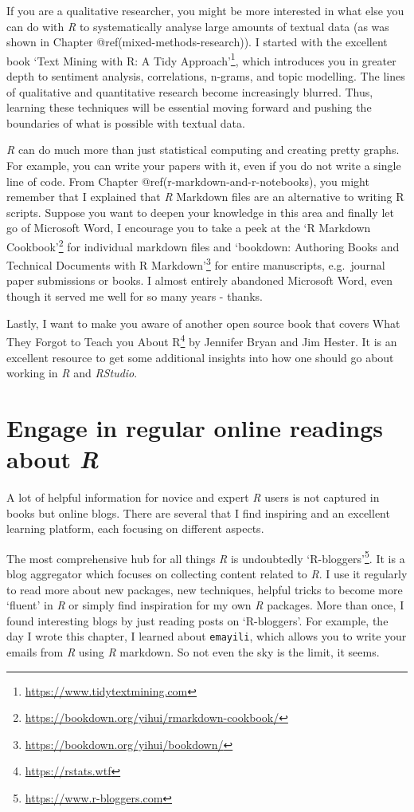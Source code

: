 \documentclass[
  letterpaper,
]{krantz}
\renewcommand{\href}[2]{#2\footnote{\url{#1}}}
\begin{document}
If you are a qualitative researcher, you might be more interested in
what else you can do with \emph{R} to systematically analyse large
amounts of textual data (as was shown in Chapter
@ref(mixed-methods-research)). I started with the excellent book
\href{https://www.tidytextmining.com}{`Text Mining with R: A Tidy
Approach'}, which introduces you in greater depth to sentiment analysis,
correlations, n-grams, and topic modelling. The lines of qualitative and
quantitative research become increasingly blurred. Thus, learning these
techniques will be essential moving forward and pushing the boundaries
of what is possible with textual data.

\emph{R} can do much more than just statistical computing and creating
pretty graphs. For example, you can write your papers with it, even if
you do not write a single line of code. From Chapter
@ref(r-markdown-and-r-notebooks), you might remember that I explained
that \emph{R} Markdown files are an alternative to writing R scripts.
Suppose you want to deepen your knowledge in this area and finally let
go of Microsoft Word, I encourage you to take a peek at the
\href{https://bookdown.org/yihui/rmarkdown-cookbook/}{`R Markdown
Cookbook'} for individual markdown files and
\href{https://bookdown.org/yihui/bookdown/}{`bookdown: Authoring Books
and Technical Documents with R Markdown'} for entire manuscripts,
e.g.~journal paper submissions or books. I almost entirely abandoned
Microsoft Word, even though it served me well for so many years -
thanks.

Lastly, I want to make you aware of another open source book that covers
\href{https://rstats.wtf}{What They Forgot to Teach you About R} by
Jennifer Bryan and Jim Hester. It is an excellent resource to get some
additional insights into how one should go about working in \emph{R} and
\emph{RStudio}.

\section{\texorpdfstring{Engage in regular online readings about
\emph{R}}{Engage in regular online readings about R}}\label{next-steps-online-readings}

A lot of helpful information for novice and expert \emph{R} users is not
captured in books but online blogs. There are several that I find
inspiring and an excellent learning platform, each focusing on different
aspects.

The most comprehensive hub for all things \emph{R} is undoubtedly
\href{https://www.r-bloggers.com}{`R-bloggers'}. It is a blog aggregator
which focuses on collecting content related to \emph{R}. I use it
regularly to read more about new packages, new techniques, helpful
tricks to become more `fluent' in \emph{R} or simply find inspiration
for my own \emph{R} packages. More than once, I found interesting blogs
by just reading posts on `R-bloggers'. For example, the day I wrote this
chapter, I learned about \texttt{emayili}, which allows you to write
your emails from \emph{R} using \emph{R} markdown. So not even the sky
is the limit, it seems.
\end{document}
